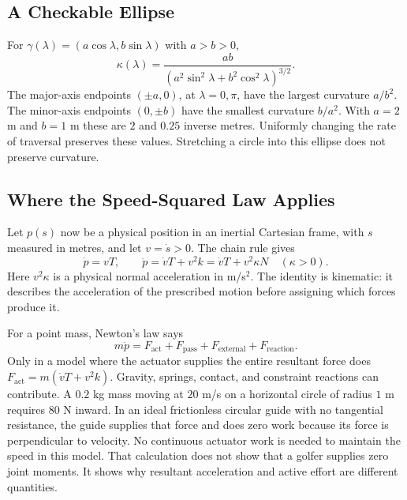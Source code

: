 \subsection{A Checkable Ellipse}

For $\gamma(\lambda)=(a\cos\lambda,b\sin\lambda)$ with $a>b>0$,
\begin{equation}
 \kappa(\lambda)=\frac{ab}
 {(a^2\sin^2\lambda+b^2\cos^2\lambda)^{3/2}}.
\end{equation}
The major-axis endpoints $(\pm a,0)$, at $\lambda=0,\pi$, have the largest
curvature $a/b^2$. The minor-axis endpoints $(0,\pm b)$ have the smallest
curvature $b/a^2$. With $a=2$ m and $b=1$ m these are $2$ and $0.25$ inverse
metres. Uniformly changing the rate of traversal preserves these values.
Stretching a circle into this ellipse does not preserve curvature.

\subsection{Where the Speed-Squared Law Applies}

Let $p(s)$ now be a physical position in an inertial Cartesian frame, with
$s$ measured in metres, and let $v=\dot s>0$. The chain rule gives
\begin{equation}\label{eq:centripetal}
 \dot p=vT,\qquad \ddot p=\dot vT+v^2k
 =\dot vT+v^2\kappa N\quad(\kappa>0).
\end{equation}
Here $v^2\kappa$ is a physical normal acceleration in m/s$^2$. The identity
is kinematic: it describes the acceleration of the prescribed motion before
assigning which forces produce it.

For a point mass, Newton's law says
\begin{equation}\label{eq:control_demand}
 m\ddot p=F_{\mathrm{act}}+F_{\mathrm{pass}}+F_{\mathrm{external}}
 +F_{\mathrm{reaction}}.
\end{equation}
Only in a model where the actuator supplies the entire resultant force does
$F_{\mathrm{act}}=m(\dot vT+v^2k)$. Gravity, springs, contact, and constraint
reactions can contribute. A $0.2$ kg mass moving at $20$ m/s on a horizontal
circle of radius $1$ m requires $80$ N inward. In an ideal frictionless
circular guide with no tangential resistance, the guide supplies that force
and does zero work because its force is perpendicular to velocity. No
continuous actuator work is needed to maintain the speed in this model.
That calculation does not show that a golfer supplies zero joint moments.
It shows why resultant acceleration and active effort are different
quantities.

